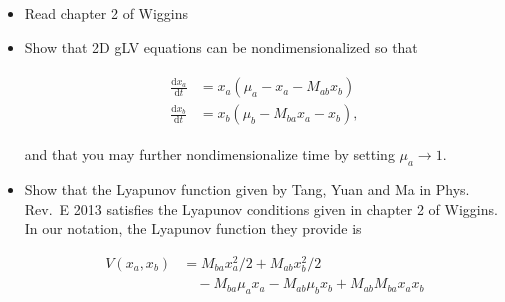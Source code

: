 \documentclass[]{article}
\def\tightlist{}
\begin{document}
\begin{itemize}
\tightlist
\item
  Read chapter 2 of Wiggins
\item
  Show that 2D gLV equations can be nondimensionalized so that

  \begin{align} \begin{split}
      \frac{\text{d}x_a}{\text{d}t} &= x_a (\mu_a - x_a - M_{ab} x_b) \\
      \frac{\text{d}x_b}{\text{d}t} &= x_b (\mu_b - M_{ba}x_a - x_b),
  \end{split} \end{align}

  and that you may further nondimensionalize time by setting
  \(\mu_a \to 1\).
\item
  Show that the Lyapunov function given by Tang, Yuan and Ma in Phys.
  Rev.~E 2013 satisfies the Lyapunov conditions given in chapter 2 of
  Wiggins. In our notation, the Lyapunov function they provide is

  \begin{equation}
  \begin{split}
    V(x_a, x_b) &= M_{ba} x_a^2/2 + M_{ab} x_b^2/2 \\ 
    &\quad - M_{ba} \mu_a x_a - M_{ab} \mu_b x_b + M_{ab} M_{ba} x_a x_b
  \end{split}
  \end{equation}


\end{itemize}
\end{document}
